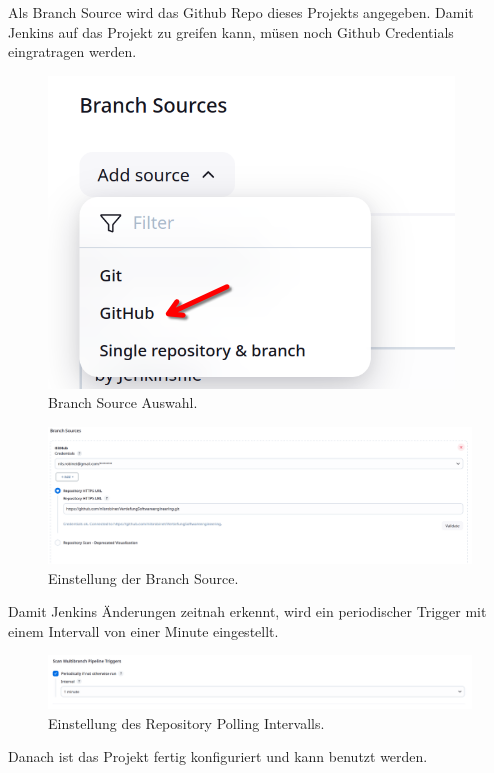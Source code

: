 Als Branch Source wird das Github Repo dieses Projekts angegeben. Damit Jenkins auf das Projekt zu greifen kann, müsen noch Github Credentials eingratragen werden.

\begin{figure}[H]
    \centering
    \includegraphics[scale=0.4]{res/Jenkins_03.png}
    \caption{Branch Source Auswahl.}
\end{figure}
\begin{figure}[H]
    \centering
    \includegraphics[scale=0.4]{res/Jenkins_05.png}
    \caption{Einstellung der Branch Source.}
\end{figure}

Damit Jenkins Änderungen zeitnah erkennt, wird ein periodischer Trigger mit einem Intervall von einer Minute eingestellt.

\begin{figure}[H]
    \centering
    \includegraphics[scale=0.4]{res/Jenkins_06.png}
    \caption{Einstellung des Repository Polling Intervalls.}
\end{figure}

Danach ist das Projekt fertig konfiguriert und kann benutzt werden.

